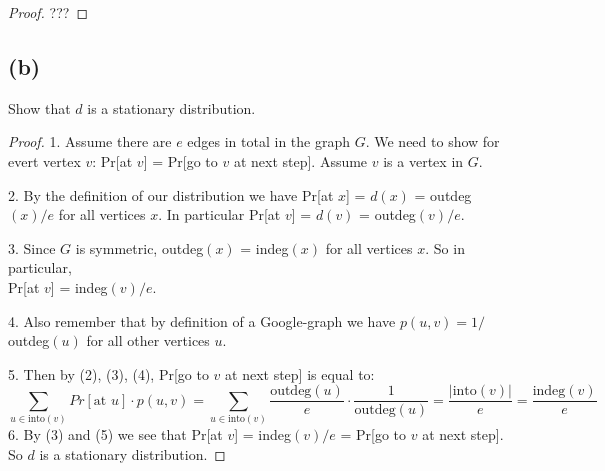 \documentclass[14pt]{extarticle}
\begin{document}
\begin{proof}
???
\end{proof}

\subsection{(b)}
Show that $d$ is a stationary distribution.

\begin{proof}
1. Assume there are $e$ edges in total in the graph $G$. We need to show for evert vertex $v$: Pr[at $v$] = Pr[go to $v$ at next step]. Assume $v$ is a vertex in $G$.

2. By the definition of our distribution we have Pr[at $x$] = $d(x)$ = outdeg$(x) / e$ for all vertices $x$. In particular Pr[at $v$] = $d(v)$ = outdeg$(v)/e$.

3. Since $G$ is symmetric, outdeg$(x)$ = indeg$(x)$ for all vertices $x$. So in particular,\\ Pr[at $v$] = indeg$(v)/e$.

4. Also remember that by definition of a Google-graph we have $p(u,v) = 1/$outdeg$(u)$ for all other vertices $u$.

5. Then by (2), (3), (4), Pr[go to $v$ at next step] is equal to:
$$
\sum_{u \in \text{into}(v)} Pr[\text{at }u] \cdot p(u,v) = \sum_{u \in \text{into}(v)} \frac{\text{outdeg}(u)}{e} \cdot \frac{1}{\text{outdeg}(u)} = \frac{|\text{into}(v)|}{e} = \frac{\text{indeg}(v)}{e}
$$
6. By (3) and (5) we see that Pr[at $v$] = indeg$(v)/e$ = Pr[go to $v$ at next step]. So $d$ is a stationary distribution.
\end{proof}
\end{document}
